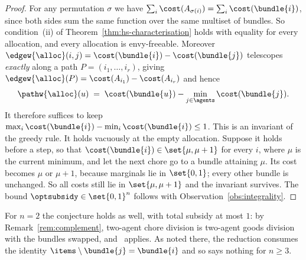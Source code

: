 \begin{proof}
For any permutation $\sigma$ we have $\sum_i \cost(A_{\sigma(i)}) =
\sum_i \cost(\bundle{i})$, since both sides sum the same function over the same
multiset of bundles. So condition~(ii) of Theorem~\ref{thm:hs-characterisation}
holds with equality for every allocation, and every allocation is
envy-freeable. Moreover $\edgew{\alloc}(i,j) = \cost(\bundle{i}) -
\cost(\bundle{j})$ telescopes \emph{exactly} along a path
$P = (i_1,\dots,i_r)$, giving $\edgew{\alloc}(P) = \cost(A_{i_1}) -
\cost(A_{i_r})$ and hence
\[
  \pathw{\alloc}(u) \;=\; \cost(\bundle{u}) - \min_{j \in \agents}
  \cost(\bundle{j}) .
\]
It therefore suffices to keep $\max_i \cost(\bundle{i}) - \min_i
\cost(\bundle{i}) \le 1$. This is an invariant of the greedy rule. It holds
vacuously at the empty allocation. Suppose it holds before a step, so that
$\cost(\bundle{i}) \in \set{\mu, \mu+1}$ for every $i$, where $\mu$ is the
current minimum, and let the next chore go to a bundle attaining $\mu$. Its cost
becomes $\mu$ or $\mu + 1$, because marginals lie in $\set{0,1}$; every other
bundle is unchanged. So all costs still lie in $\set{\mu,\mu+1}$ and the
invariant survives. The bound $\optsubsidy \in \set{0,1}^n$ follows with
Observation~\ref{obs:integrality}.
\end{proof}

For $n = 2$ the conjecture holds as well, with total subsidy at most $1$: by
Remark~\ref{rem:complement}, two-agent chore division is two-agent goods
division with the bundles swapped, and~\cite[Theorem~4]{BKNS22} applies. As
noted there, the reduction consumes the identity $\items \setminus \bundle{j} =
\bundle{i}$ and so says nothing for $n \ge 3$.
